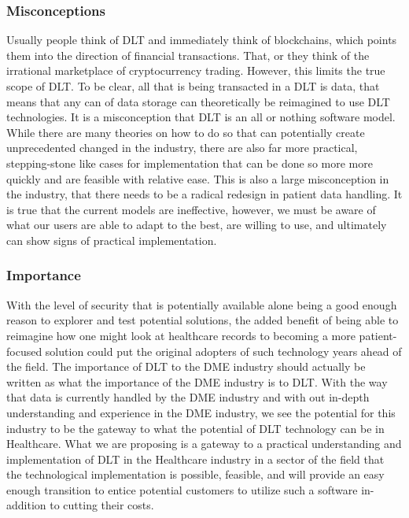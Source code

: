 \documentclass[12pt]{article}
\begin{document}
    \subsubsection{Misconceptions}
    Usually people think of DLT and immediately think of blockchains, which points them into the direction of financial transactions. That, or they think of the irrational marketplace of cryptocurrency trading. However, this limits the true scope of DLT. To be clear, all that is being transacted in a DLT is data, that means that any can of data storage can theoretically be reimagined to use DLT technologies. It is a misconception that DLT is an all or nothing software model. While there are many theories on how to do so that can potentially create unprecedented changed in the industry, there are also far more practical, stepping-stone like cases for implementation that can be done so more more quickly and are feasible with relative ease. This is also a large misconception in the industry, that there needs to be a radical redesign in patient data handling. It is true that the current models are ineffective, however, we must be aware of what our users are able to adapt to the best, are willing to use, and ultimately can show signs of practical implementation.

    \subsubsection{Importance}
    With the level of security that is potentially available alone being a good enough reason to explorer and test potential solutions, the added benefit of being able to reimagine how one might look at healthcare records to becoming a more patient-focused solution could put the original adopters of such technology years ahead of the field. The importance of DLT to the DME industry should actually be written as what the importance of the DME industry is to DLT. With the way that data is currently handled by the DME industry and with out in-depth understanding and experience in the DME industry, we see the potential for this industry to be the gateway to what the potential of DLT technology can be in Healthcare. What we are proposing is a gateway to a practical understanding and implementation of DLT in the Healthcare industry in a sector of the field that the technological implementation is possible, feasible, and will provide an easy enough transition to entice potential customers to utilize such a software in-addition to cutting their costs.
\end{document}
